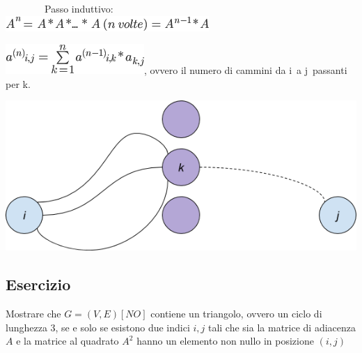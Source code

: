 \documentclass{article}
\begin{document}
{{{{~~~~~~~~Passo induttivo:\\
\hspace*{0.333em}\hspace*{0.333em}\hspace*{0.333em}\hspace*{0.333em}\hspace*{0.333em}\hspace*{0.333em}\hspace*{0.333em}\hspace*{0.333em}\hspace*{0.333em}\hspace*{0.333em}\hspace*{0.333em}\hspace*{0.333em}\hspace*{0.333em}\hspace*{0.333em}\hspace*{0.333em}\hspace*{0.333em}}\includegraphics{images/image418.png}

\includegraphics{images/image419.png}{, ovvero il
numero di cammini da }{i}{~a }{j}{~passanti per }{k}{.}

{\includegraphics{images/image538.png}}

\subsection{Esercizio}

{Mostrare che $G=(V,E) [NO]$ contiene un triangolo, ovvero un ciclo di lunghezza 3, se e solo se esistono due indici $i,j$ tali che sia la matrice di adiacenza $A$ e la matrice al quadrato $A^2$ hanno un elemento non nullo in posizione $(i,j)$}

}}}
\end{document}
